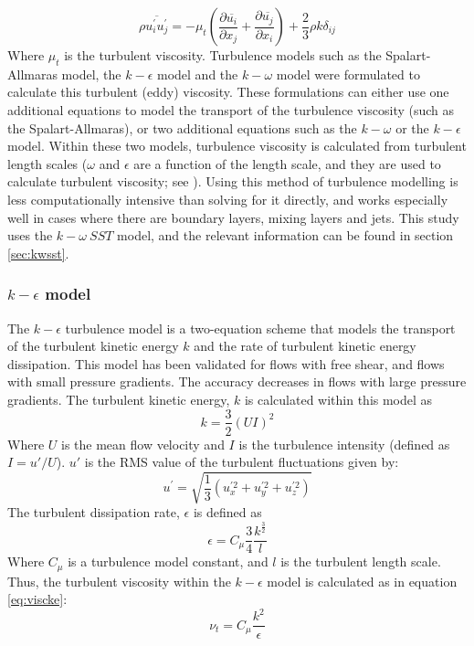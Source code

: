 \documentclass[11pt,a4paper,twoside,oneside]{article}
\begin{document}
\begin{equation}
    \label{eq:bous}
    \rho \overline{u_{i}^{\prime} u_{j}^{\prime}}=-\mu_{t}\left(\frac{\partial \overline{u_{i}}}{\partial x_{j}}+\frac{\partial \overline{u_{j}}}{\partial x_{i}}\right)+\frac{2}{3}\rho k\delta_{i j}
\end{equation}
Where $\mu_t$ is the turbulent viscosity. Turbulence models such as the Spalart-Allmaras model, the $k-\epsilon$ model and the $k-\omega$ model were formulated to calculate this turbulent (eddy) viscosity. These formulations can either use one additional equations to model the transport of the turbulence viscosity (such as the Spalart-Allmaras), or two additional equations such as the $k-\omega$ or the $k-\epsilon$ model. Within these two models, turbulence viscosity is calculated from turbulent length scales ($\omega$ and $\epsilon$ are a function of the length scale, and they are used to calculate turbulent viscosity; see \cite{versteeg}). Using this method of turbulence modelling is less computationally intensive than solving for it directly, and works especially well in cases where there are boundary layers, mixing layers and jets\cite{halschmitt}. This study uses the $k-\omega\ SST$ model, and the relevant information can be found in section \ref{sec:kwsst}.


\subsubsection{\texorpdfstring{$k-\epsilon$}{k-e} model}\label{sec:kemodel}
The $k-\epsilon$ turbulence model is a two-equation scheme that models the transport of the turbulent kinetic energy $k$ and the rate of turbulent kinetic energy dissipation. This model has been validated for flows with free shear, and flows with small pressure gradients. The accuracy decreases in flows with large pressure gradients\cite{kepsilon}\cite{kepsilon2}.
The turbulent kinetic energy, $k$ is calculated within this model as\cite{nasaturb} $$
k=\frac{3}{2}(U I)^{2}
$$ Where $U$ is the mean flow velocity and $I$ is the turbulence intensity (defined as $I=u'/U$). $u'$ is the RMS value of the turbulent fluctuations given by: $$
u^{\prime}=\sqrt{\frac{1}{3}\left(u_{x}^{\prime 2}+u_{y}^{\prime 2}+u_{z}^{\prime 2}\right)}
$$
The turbulent dissipation rate, $\epsilon$ is defined as $$
\epsilon=C_{\mu} \frac{3}{4} \frac{k^{\frac{3}{2}}}{l}
$$
Where $C_\mu$ is a turbulence model constant, and $l$ is the turbulent length scale.
Thus, the turbulent viscosity within the $k-\epsilon$ model is calculated as in equation \ref{eq:viscke}:
\begin{equation}\label{eq:viscke}
\nu_{t}=C_\mu \frac{k^{2}}{\epsilon}
\end{equation}
\end{document}
